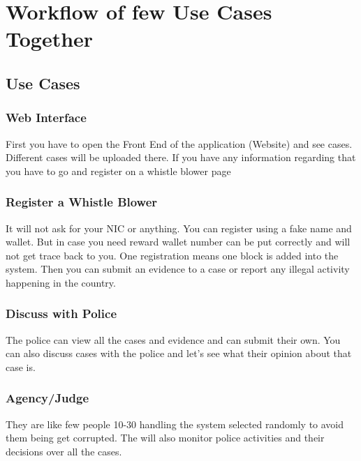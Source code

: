 \section{Workflow of few Use Cases Together }
\subsection{Use Cases}
\subsubsection{Web Interface}
First you have to open the Front End of the application (Website) and see cases. Different cases will be uploaded there.
If you have any information regarding that you have to go and register on a whistle blower page
\subsubsection{Register a Whistle Blower}
It will not ask for your NIC or anything. You can register using a fake name and wallet. But in case you need reward wallet number can be put correctly and will not get trace back to you. One registration means one block is added into the system. Then you can submit an evidence to a case or report any illegal activity happening in the country.
\subsubsection{Discuss with Police}
The police can view all the cases and evidence and can submit their own. You can also discuss cases with the police and let’s see what their opinion about that case is. 
\subsubsection{Agency/Judge}
They are like few people 10-30 handling the system selected randomly to avoid them being get corrupted. The will also monitor police activities and their decisions over all the cases.  
